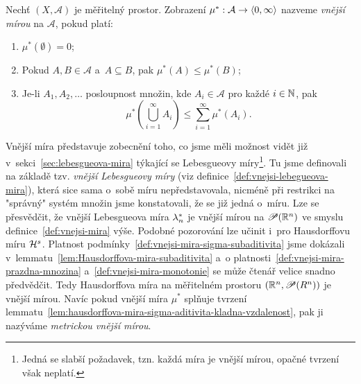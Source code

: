 \begin{definition}\label{def:vnejsi-mira}
    Nechť $(X,\mathcal{A})$ je měřitelný prostor. Zobrazení $\mu^*:\mathcal{A} \rightarrow \langle0,\infty\rangle$ nazveme \emph{vnější mírou} na $\mathcal{A}$, pokud platí:
    \begin{enumerate}[label=(\alph*)]
        \item\label{def:vnejsi-mira-prazdna-mnozina} $\mu^*(\emptyset)=0$;
        \item\label{def:vnejsi-mira-monotonie} Pokud $A,B\in\mathcal{A}$ a~$A\subseteq B$, pak $\mu^*(A)\leqslant\mu^*(B)$;
        \item\label{def:vnejsi-mira-sigma-subaditivita} Je-li $A_1,A_2,\ldots$ posloupnost množin, kde $A_i\in\mathcal{A}$ pro každé $i\in\mathbb{N}$, pak
        \[\mu^*\left(\bigcup_{i=1}^\infty A_i\right)\leqslant\sum_{i=1}^{\infty}\mu^*(A_i).\]
    \end{enumerate}
\end{definition}

Vnější míra představuje zobecnění toho, co jsme měli možnost vidět již v~sekci~\ref{sec:lebesgueova-mira} týkající se Lebesgueovy míry\footnote{Jedná se slabší požadavek, tzn. každá míra je vnější mírou, opačné tvrzení však neplatí.}. Tu jsme definovali na základě tzv. \emph{vnější Lebesgueovy míry} (viz definice~\ref{def:vnejsi-lebegueova-mira}), která sice sama o~sobě míru nepředstavovala, nicméně při restrikci na "správný" systém množin jsme konstatovali, že se již jedná o~míru. Lze se přesvědčit, že vnější Lebesgueova míra $\lambda_n^*$ je vnější mírou na $\mathscr{P}(\mathbb{R}^n)$ ve smyslu definice~\ref{def:vnejsi-mira} výše. Podobné pozorování lze učinit i~pro Hausdorffovu míru $\mathcal{H}^{s}$. Platnost podmínky~\ref{def:vnejsi-mira-sigma-subaditivita} jsme dokázali v~lemmatu~\ref{lem:Hausdorffova-mira-subaditivita} a~o platnosti~\ref{def:vnejsi-mira-prazdna-mnozina} a~\ref{def:vnejsi-mira-monotonie} se může čtenář velice snadno předvědčit. Tedy Hausdorffova míra na měřitelném prostoru $(\mathbb{R}^n,\mathscr{P}(R^n))$ je vnější mírou. Navíc pokud vnější míra $\mu^*$ splňuje tvrzení lemmatu~\ref{lem:hausdorffova-mira-sigma-aditivita-kladna-vzdalenost}, pak ji nazýváme \emph{metrickou vnější mírou}.

